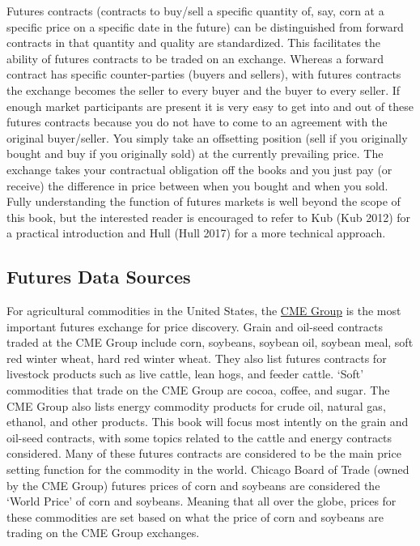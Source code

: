 \documentclass[
  letterpaper,
  DIV=11,
  numbers=noendperiod]{scrreprt}
\begin{document}
Futures contracts (contracts to buy/sell a specific quantity of, say,
corn at a specific price on a specific date in the future) can be
distinguished from forward contracts in that quantity and quality are
standardized. This facilitates the ability of futures contracts to be
traded on an exchange. Whereas a forward contract has specific
counter-parties (buyers and sellers), with futures contracts the
exchange becomes the seller to every buyer and the buyer to every
seller. If enough market participants are present it is very easy to get
into and out of these futures contracts because you do not have to come
to an agreement with the original buyer/seller. You simply take an
offsetting position (sell if you originally bought and buy if you
originally sold) at the currently prevailing price. The exchange takes
your contractual obligation off the books and you just pay (or receive)
the difference in price between when you bought and when you sold. Fully
understanding the function of futures markets is well beyond the scope
of this book, but the interested reader is encouraged to refer to Kub
(Kub 2012) for a practical introduction and Hull (Hull 2017) for a more
technical approach.

\hypertarget{futures-data-sources}{%
\subsection{Futures Data Sources}\label{futures-data-sources}}

For agricultural commodities in the United States, the
\href{http://www.cmegroup.com/}{CME Group} is the most important futures
exchange for price discovery. Grain and oil-seed contracts traded at the
CME Group include corn, soybeans, soybean oil, soybean meal, soft red
winter wheat, hard red winter wheat. They also list futures contracts
for livestock products such as live cattle, lean hogs, and feeder
cattle. `Soft' commodities that trade on the CME Group are cocoa,
coffee, and sugar. The CME Group also lists energy commodity products
for crude oil, natural gas, ethanol, and other products. This book will
focus most intently on the grain and oil-seed contracts, with some
topics related to the cattle and energy contracts considered. Many of
these futures contracts are considered to be the main price setting
function for the commodity in the world. Chicago Board of Trade (owned
by the CME Group) futures prices of corn and soybeans are considered the
`World Price' of corn and soybeans. Meaning that all over the globe,
prices for these commodities are set based on what the price of corn and
soybeans are trading on the CME Group exchanges.
\end{document}
